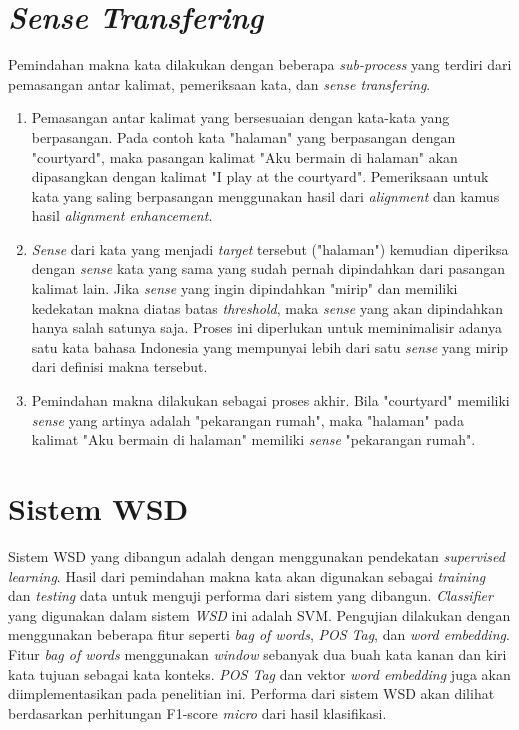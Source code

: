 \section{\textit{Sense Transfering}} \label{sec:Sense Transfering}
Pemindahan makna kata dilakukan dengan beberapa \textit{sub-process} yang terdiri dari pemasangan antar kalimat, pemeriksaan kata, dan \textit{sense transfering}.
\begin{enumerate}
	\item Pemasangan antar kalimat yang bersesuaian dengan kata-kata yang berpasangan. Pada contoh kata "halaman" yang berpasangan dengan "courtyard", maka pasangan kalimat "Aku bermain di halaman" akan dipasangkan dengan kalimat "I play at the courtyard". Pemeriksaan untuk kata yang saling berpasangan menggunakan hasil dari \textit{alignment} dan kamus hasil \textit{alignment enhancement}.
	\item \textit{Sense} dari kata yang menjadi \textit{target} tersebut ("halaman") kemudian diperiksa dengan \textit{sense} kata yang sama yang sudah pernah dipindahkan dari pasangan kalimat lain. Jika \textit{sense} yang ingin dipindahkan "mirip" dan memiliki kedekatan makna diatas batas \textit{threshold}, maka \textit{sense} yang akan dipindahkan hanya salah satunya saja. Proses ini diperlukan untuk meminimalisir adanya satu kata bahasa Indonesia yang mempunyai lebih dari satu \textit{sense} yang mirip dari definisi makna tersebut.
	\item Pemindahan makna dilakukan sebagai proses akhir. Bila "courtyard" memiliki \textit{sense} yang artinya adalah "pekarangan rumah", maka "halaman" pada kalimat "Aku bermain di halaman" memiliki \textit{sense} "pekarangan rumah".
\end{enumerate}

\section{Sistem WSD} \label{sec:Sistem WSD}
Sistem WSD yang dibangun adalah dengan menggunakan pendekatan \textit{supervised learning}. Hasil dari pemindahan makna kata akan digunakan sebagai \textit{training} dan \textit{testing} data untuk menguji performa dari sistem yang dibangun. \textit{Classifier} yang digunakan dalam sistem \textit{WSD} ini adalah SVM. Pengujian dilakukan dengan menggunakan beberapa fitur seperti \textit{bag of words}, \textit{POS Tag}, dan \textit{word embedding}. Fitur \textit{bag of words} menggunakan \textit{window} sebanyak dua buah kata kanan dan kiri kata tujuan sebagai kata konteks. \textit{POS Tag} dan vektor \textit{word embedding} juga akan diimplementasikan pada penelitian ini. Performa dari sistem WSD akan dilihat berdasarkan perhitungan F1-score \textit{micro} dari hasil klasifikasi.